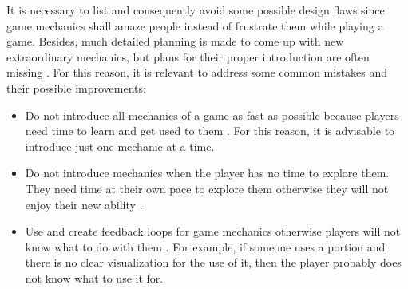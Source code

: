 \documentclass[MGS,Master,english]{twbook}%
\begin{document}
It is necessary to list and consequently avoid some possible design flaws since game mechanics shall amaze people instead of frustrate them while playing a game. Besides, much detailed planning is made to come up with new extraordinary mechanics, but plans for their proper introduction are often missing \cite{mechanic::gamasutra::MaxPears}. For this reason, it is relevant to address some common mistakes and their possible improvements:
\begin{itemize}
	\item Do not introduce all mechanics of a game as fast as possible because players need time to learn and get used to them \cite{mechanic::gamasutra::MaxPears}. For this reason, it is advisable to introduce just one mechanic at a time. 
	\item Do not introduce mechanics when the player has no time to explore them. They need time at their own pace to explore them otherwise they will not enjoy their new ability \cite{mechanic::gamasutra::MaxPears}. 
	\item Use and create feedback loops for game mechanics otherwise players will not know what to do with them \cite{gameDesign::gameMechanicsAdvancedGameDesign}. For example, if someone uses a portion and there is no clear visualization for the use of it, then the player probably does not know what to use it for.
	

\end{itemize}
\end{document}
